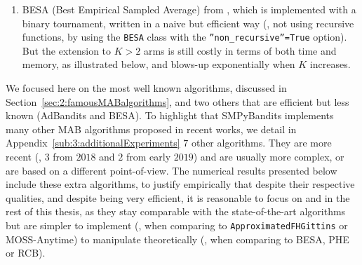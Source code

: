 \begin{enumerate}
    \item
    BESA (Best Empirical Sampled Average) from \cite{Baransi2014},
    which is implemented with a binary tournament, written in a naive but efficient way
    (\ie, not using recursive functions, by using the \texttt{BESA} class with the \texttt{''non\_recursive''=True} option).
    But the extension to $K>2$ arms is still costly in terms of both time and memory, as illustrated below, and blows-up exponentially  when $K$ increases.
\end{enumerate}

We focused here on the most well known algorithms, discussed in Section~\ref{sec:2:famousMABalgorithms}, and two others that are efficient but less known (AdBandits and BESA).
To highlight that SMPyBandits implements many other MAB algorithms proposed in recent works, we detail in Appendix~\ref{sub:3:additionalExperiments} $7$ other algorithms.
They are more recent (\eg, $3$ from $2018$ and $2$ from early $2019$) and are usually more complex, or are based on a different point-of-view.
The numerical results presented below include these extra algorithms, to justify empirically that despite their respective qualities, and despite being very efficient, it is reasonable to focus on \UCB{} and \klUCB{} in the rest of this thesis, as they stay comparable with the state-of-the-art algorithms but are simpler to implement (\eg, when comparing \UCB{} to \texttt{ApproximatedFHGittins} or $\mathrm{MOSS}$-$\mathrm{Anytime}$) to manipulate theoretically (\eg, when comparing \klUCB{} to BESA, PHE or RCB).


